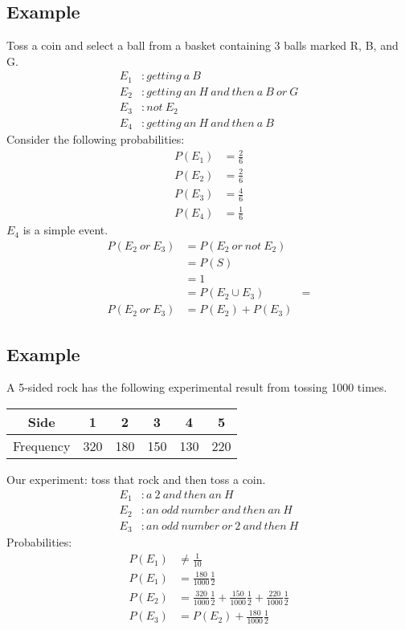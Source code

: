 \documentclass[letterpaper, 12pt]{math}
\begin{document}
\subsection*{Example}
Toss a coin and select a ball from a basket containing 3 balls marked R, B, and
G.
\begin{align*}
  E_{1}&: getting\ a\ B \\
  E_{2}&: getting\ an\ H\ and\ then\ a\ B\ or\ G \\
  E_{3}&: not\ E_{2} \\
  E_{4}&: getting\ an\ H\ and\ then\ a\ B
\end{align*}
Consider the following probabilities:
\begin{align*}
  P(E_{1}) &= \frac{2}{6} \\
  P(E_{2}) &= \frac{2}{6} \\
  P(E_{3}) &= \frac{4}{6} \\
  P(E_{4}) &= \frac{1}{6}
\end{align*}
\( E_{4} \) is a simple event.
\begin{align*}
  P(E_{2}\ or\ E_{3}) &= P(E_{2}\ or\ not\ E_{2}) \\
  &= P(S) \\
  &= 1 \\
  &= P(E_{2} \cup E_{3}) &= \\
  P(E_{2}\ or\ E_{3}) &= P(E_{2}) + P(E_{3})
\end{align*}

\subsection*{Example}
A 5-sided rock has the following experimental result from tossing 1000 times.
\begin{center}
  \begin{tabular}{|c|c|c|c|c|c|}
    \hline
    Side      & 1   & 2   & 3   & 4   & 5 \\
    \hline
    Frequency & 320 & 180 & 150 & 130 & 220 \\
    \hline
  \end{tabular}
\end{center}
Our experiment: toss that rock and then toss a coin.
\begin{align*}
  E_{1}&: a\ 2\ and\ then\ an\ H \\
  E_{2}&: an\ odd\ number\ and\ then\ an\ H \\
  E_{3}&: an\ odd\ number\ or\ 2\ and\ then\ H
\end{align*}
Probabilities:
\begin{align*}
  P(E_{1}) &\neq \frac{1}{10} \\
  P(E_{1}) &= \frac{180}{1000}\frac{1}{2} \\
  P(E_{2}) &= \frac{320}{1000}\frac{1}{2} + \frac{150}{1000}\frac{1}{2}+
    \frac{220}{1000}\frac{1}{2} \\
  P(E_{3}) &= P(E_{2}) + \frac{180}{1000}\frac{1}{2}
\end{align*}
\end{document}
